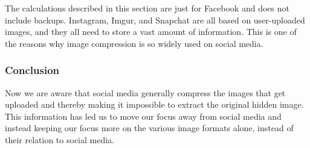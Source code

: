 The calculations described in this section are just for Facebook and does not include backups. Instagram, Imgur,
and Snapchat are all based on user-uploaded images, and they all need to store a vast amount of information.
This is one of the reasons why image compression is so widely used on social media.

\subsubsection*{Conclusion}
Now we are aware that social media generally compress the images that get uploaded and thereby making it impossible to extract the original hidden image.
This information has led us to move our focus away from social media and instead keeping our focus more on the various image formats alone, instead of their relation to social media.
